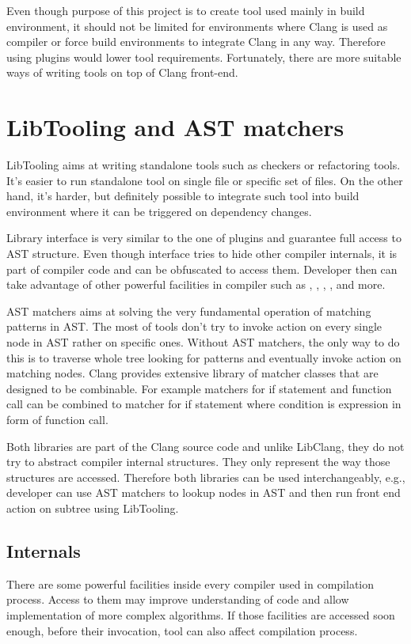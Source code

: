 Even though purpose of this project is to create tool used mainly in build environment, it should not be limited for environments where Clang is used as compiler or force build environments to integrate Clang in any way. Therefore using plugins would lower tool requirements. Fortunately, there are more suitable ways of writing tools on top of Clang front-end.

\section{LibTooling and AST matchers}
LibTooling aims at writing standalone tools such as checkers or refactoring tools. It's easier to run standalone tool on single file or specific set of files. On the other hand, it's harder, but definitely possible to integrate such tool into build environment where it can be triggered on dependency changes.

Library interface is very similar to the one of plugins and guarantee full access to AST structure. Even though interface tries to hide other compiler internals, it is part of compiler code and can be obfuscated to access them. Developer then can take advantage of other powerful facilities in compiler such as , , , ,  and more.

AST matchers aims at solving the very fundamental operation of matching patterns in AST. The most of tools don't try to invoke action on every single node in AST rather on specific ones. Without AST matchers, the only way to do this is to traverse whole tree looking for patterns and eventually invoke action on matching nodes. Clang provides extensive library of matcher classes that are designed to be combinable. For example matchers for if statement and function call can be combined to matcher for if statement where condition is expression in form of function call.

Both libraries are part of the Clang source code and unlike LibClang, they do not try to abstract compiler internal structures. They only represent the way those structures are accessed. Therefore both libraries can be used interchangeably, e.g., developer can use AST matchers to lookup nodes in AST and then run front end action on subtree using LibTooling.

\subsection{Internals}
There are some powerful facilities inside every compiler used in compilation process. Access to them may improve understanding of code and allow implementation of more complex algorithms. If those facilities are accessed soon enough, before their invocation, tool can also affect compilation process.

